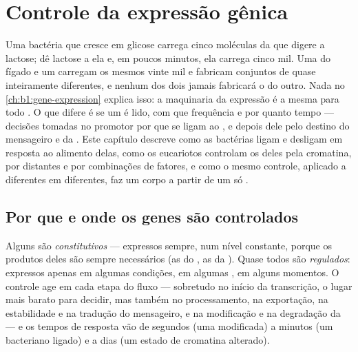 \chapter{Controle da expressão gênica}\label{ch:b1:expression-control}

Uma bactéria que cresce em glicose carrega cinco moléculas da  que
digere a lactose; dê lactose a ela e, em poucos minutos, ela carrega
cinco mil. Uma  do fígado e um  carregam os mesmos vinte
mil  e fabricam conjuntos de  quase inteiramente
diferentes, e nenhum dos dois jamais fabricará o do outro. Nada no
\cref{ch:b1:gene-expression} explica isso: a maquinaria da expressão é a
mesma para todo . O que difere é se um  é lido, com que
frequência e por quanto tempo --- decisões tomadas no promotor por
 que se ligam ao , e depois dele pelo destino do mensageiro
e da . Este capítulo descreve como as bactérias ligam e desligam
 em resposta ao alimento delas, como os eucariotos controlam os
 deles pela cromatina, por  distantes e por
combinações de fatores, e como o mesmo controle, aplicado a 
diferentes em  diferentes, faz um corpo a partir de um só .

\section{Por que e onde os genes são controlados}

\begin{proposition}\label{prop:b1:expression-control:levels}
Alguns  são \emph{constitutivos} --- expressos sempre, num nível
constante, porque os produtos deles são sempre necessários (as 
do , as  da ). Quase todos são
\emph{regulados}: expressos apenas em algumas condições, em algumas
, em alguns momentos. O controle age em cada etapa do fluxo ---
sobretudo no início da transcrição, o lugar mais barato para decidir,
mas também no processamento, na exportação, na estabilidade e na
tradução do mensageiro, e na modificação e na degradação da  ---
e os tempos de resposta vão de segundos (uma  modificada) a
minutos (um  bacteriano ligado) e a dias (um estado de cromatina
alterado).
\end{proposition}

